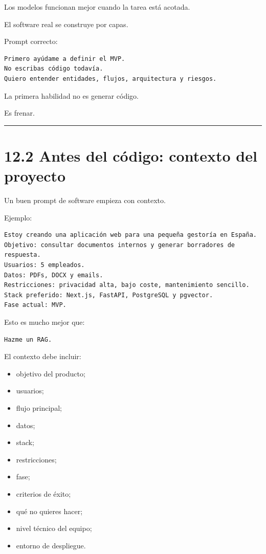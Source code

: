 Los modelos funcionan mejor cuando la tarea está acotada.

El software real se construye por capas.

Prompt correcto:

\begin{lstlisting}
Primero ayúdame a definir el MVP.
No escribas código todavía.
Quiero entender entidades, flujos, arquitectura y riesgos.
\end{lstlisting}

La primera habilidad no es generar código.

Es frenar.

\begin{center}\rule{0.5\linewidth}{0.5pt}\end{center}

\section{12.2 Antes del código: contexto del
proyecto}\label{antes-del-cuxf3digo-contexto-del-proyecto}

Un buen prompt de software empieza con contexto.

Ejemplo:

\begin{lstlisting}
Estoy creando una aplicación web para una pequeña gestoría en España.
Objetivo: consultar documentos internos y generar borradores de respuesta.
Usuarios: 5 empleados.
Datos: PDFs, DOCX y emails.
Restricciones: privacidad alta, bajo coste, mantenimiento sencillo.
Stack preferido: Next.js, FastAPI, PostgreSQL y pgvector.
Fase actual: MVP.
\end{lstlisting}

Esto es mucho mejor que:

\begin{lstlisting}
Hazme un RAG.
\end{lstlisting}

El contexto debe incluir:

\begin{itemize}
\tightlist
\item
  objetivo del producto;
\item
  usuarios;
\item
  flujo principal;
\item
  datos;
\item
  stack;
\item
  restricciones;
\item
  fase;
\item
  criterios de éxito;
\item
  qué no quieres hacer;
\item
  nivel técnico del equipo;
\item
  entorno de despliegue.
\end{itemize}

